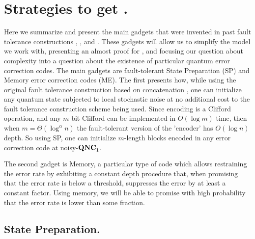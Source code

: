 \documentclass[manuscript,screen,review]{acmart}
\begin{document}
{  \section{ Strategies to get \CDO. }  \label{sec:opt}
 
Here we summarize and present the main gadgets that were invented in past fault tolerance constructions \cite{aharonov1999faulttolerant}, \cite{gottesman2014faulttolerant}, and \cite{grospellier:tel-03364419}. These gadgets will allow us to simplify the model we work with, presenting an almost proof for \CDO, and focusing our question about complexity into a question about the existence of particular quantum error correction codes. The main gadgets are fault-tolerant State Preparation (SP) and Memory error correction codes (ME). The first presents how, while using the original fault tolerance construction based on concatenation \cite{aharonov1999faulttolerant}, one can initialize any quantum state subjected to local stochastic noise at no additional cost to the fault tolerance construction scheme being used. Since encoding is a Clifford operation, and any $m$-bit Clifford can be implemented in $O(\log m)$ time, then when $m =\Theta(\log^{\alpha} n)$ the fault-tolerant version of the 'encoder' has $O(\log n)$ depth. So using SP, one can initialize $m$-length blocks encoded in any error correction code at noisy-$\mathbf{QNC}_{1}{}$.

The second gadget is Memory, a particular type of code which allows restraining the error rate by exhibiting a constant depth procedure that, when promising that the error rate is below a threshold, suppresses the error by at least a constant factor. Using memory, we will be able to promise with high probability that the error rate is lower than some fraction. 

\subsection{State Preparation.}


}
\end{document}
